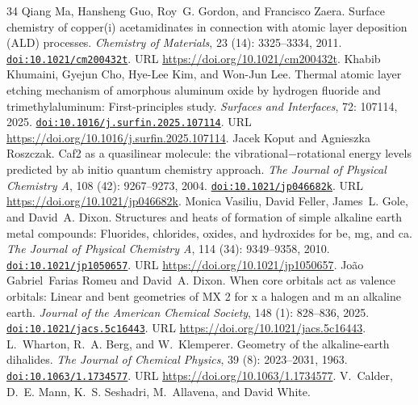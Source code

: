 \documentclass[11pt,a4paper]{article}
\theoremstyle{plain}
\theoremstyle{definition}
\theoremstyle{remark}
\providecommand{\doi}[1]{\href{https://doi.org/#1}{\texttt{doi:#1}}}
\begin{document}
\begin{thebibliography}{34}
Qiang Ma, Hansheng Guo, Roy~G. Gordon, and Francisco Zaera.
\newblock Surface chemistry of copper(i) acetamidinates in connection with
  atomic layer deposition ({ALD}) processes.
\newblock \emph{Chemistry of Materials}, 23 (14): 3325--3334,
  2011.
\newblock \doi{10.1021/cm200432t}.
\newblock URL \url{https://doi.org/10.1021/cm200432t}.
Khabib Khumaini, Gyejun Cho, Hye-Lee Kim, and Won-Jun Lee.
\newblock Thermal atomic layer etching mechanism of amorphous aluminum oxide by
  hydrogen fluoride and trimethylaluminum: First-principles study.
\newblock \emph{Surfaces and Interfaces}, 72: 107114, 2025.
\newblock \doi{10.1016/j.surfin.2025.107114}.
\newblock URL \url{https://doi.org/10.1016/j.surfin.2025.107114}.
Jacek Koput and Agnieszka Roszczak.
\newblock Caf2 as a quasilinear molecule: the vibrational−rotational energy
  levels predicted by ab initio quantum chemistry approach.
\newblock \emph{The Journal of Physical Chemistry A}, 108
  (42): 9267--9273, 2004.
\newblock \doi{10.1021/jp046682k}.
\newblock URL \url{https://doi.org/10.1021/jp046682k}.
Monica Vasiliu, David Feller, James~L. Gole, and David~A. Dixon.
\newblock Structures and heats of formation of simple alkaline earth metal
  compounds: Fluorides, chlorides, oxides, and hydroxides for be, mg, and ca.
\newblock \emph{The Journal of Physical Chemistry A}, 114
  (34): 9349--9358, 2010.
\newblock \doi{10.1021/jp1050657}.
\newblock URL \url{https://doi.org/10.1021/jp1050657}.
João Gabriel~Farias Romeu and David~A. Dixon.
\newblock When core orbitals act as valence orbitals: Linear and bent
  geometries of {MX} 2 for x a halogen and m an alkaline earth.
\newblock \emph{Journal of the American Chemical Society}, 148
  (1): 828--836, 2025.
\newblock \doi{10.1021/jacs.5c16443}.
\newblock URL \url{https://doi.org/10.1021/jacs.5c16443}.
L.~Wharton, R.~A. Berg, and W.~Klemperer.
\newblock Geometry of the alkaline-earth dihalides.
\newblock \emph{The Journal of Chemical Physics}, 39 (8):
  2023--2031, 1963.
\newblock \doi{10.1063/1.1734577}.
\newblock URL \url{https://doi.org/10.1063/1.1734577}.
V.~Calder, D.~E. Mann, K.~S. Seshadri, M.~Allavena, and David White.

\end{thebibliography}
\end{document}
